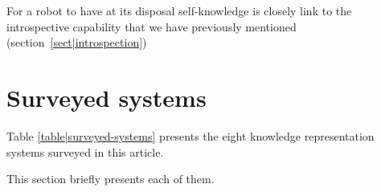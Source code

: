 For a robot to have at its disposal self-knowledge is closely link to the
introspective capability that we have previously mentioned
(section~\ref{sect|introspection})


\section{Surveyed systems}
\label{sect|surveyed-systems}

Table \ref{table|surveyed-systems} presents the eight knowledge representation
systems surveyed in this article.

This section briefly presents each of them.

\begin{landscape}
\begin{table}\footnotesize
\begin{center}


\end{center}
\end{table}
\end{landscape}
